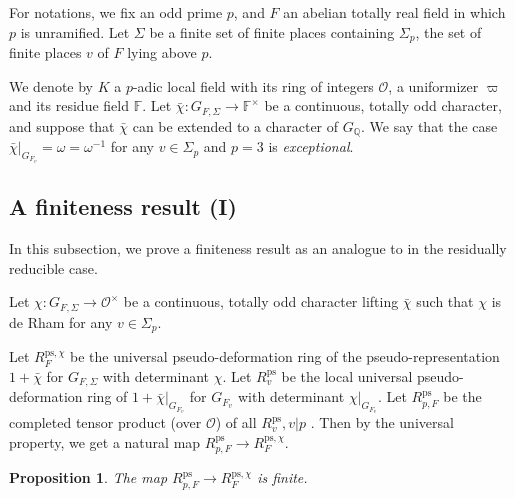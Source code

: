 \documentclass[a4paper, 12pt]{amsart}
\newtheorem{prop}[thm]{Proposition}
\def\ps{\mathrm{ps}}
\newcommand{\F}{\mathbb{F}}
\newcommand{\Q}{\mathbb{Q}}
\newcommand{\cO}{\mathcal{O}}
\begin{document}
    For notations, we fix an odd prime $p$, and $F$ an abelian totally real field in which $p$ is unramified. Let $\Sigma$ be a finite set of finite places containing $\Sigma_p$, the set of finite places $v$ of $F$ lying above $p$. 
    
    We denote by $K$  a $p$-adic local field with its ring of integers $\cO$, a uniformizer $\varpi$ and its residue field $\F$. Let $\bar{\chi}: G_{F, \Sigma} \to \F^\times$ be a continuous, totally odd character, and suppose that $\bar{\chi} $ can be extended to a character of $G_{\Q}$. We say that the case $ \bar{\chi}|_{G_{F_v}}=\omega=\omega^{-1}$ for any $v \in \Sigma_p$ and $p=3$ is \textit{exceptional}.
    
    \subsection{A finiteness result (I)}
    
    In this subsection, we prove a finiteness result as an analogue to \cite[Theorem 1]{Allen_2014} in the residually reducible case.
    
    Let $\chi: G_{F, \Sigma} \to \cO^\times$ be a continuous, totally odd character lifting $\bar{\chi}$ such that $\chi$ is de Rham for any $v \in \Sigma_p$. 
    
    Let $R_{F}^{\ps, \chi}$ be the universal pseudo-deformation ring of the pseudo-representation $1+\bar{\chi}$ for $ G_{F, \Sigma}$ with determinant $\chi$. Let $R_v^\ps$ be the local universal pseudo-deformation ring of $1+\bar{\chi}|_{G_{F_v}}$  for $ {G_{F_v}}$ with determinant $\chi|_{G_{F_v}}$. Let $R_{p, F}^\ps$ be the completed tensor product (over $\cO$) of all $R^{\ps}_v, v|p$ . Then by the universal property, we get a natural map $R_{p, F}^\ps \to R_{F}^{\ps, \chi}$.
    
    \begin{prop}\label{finiteness1}
    	The map $R_{p, F}^\ps \to R_{F}^{\ps, \chi}$ is finite.
    \end{prop}
    
\end{document}
